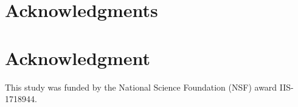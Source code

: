 \documentclass[10pt,journal,compsoc]{IEEEtran}
\begin{document}
\ifCLASSOPTIONcompsoc
\section*{Acknowledgments}
\else
\section*{Acknowledgment}
\fi


This study was funded by the National Science Foundation (NSF) award IIS-1718944.


\ifCLASSOPTIONcaptionsoff
\newpage
\fi










% 

\end{document}
